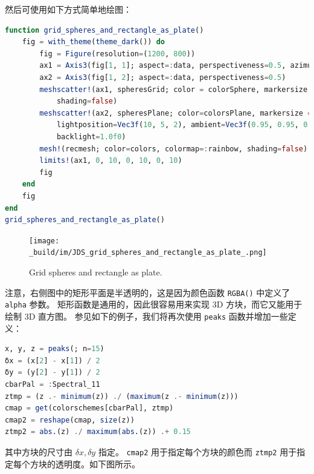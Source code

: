 \documentclass[
  notoc %
]{tufte-book}
\newcommand{\passthrough}[1]{#1}
\begin{document}
然后可使用如下方式简单地绘图：

\begin{lstlisting}[language=Julia]
function grid_spheres_and_rectangle_as_plate()
    fig = with_theme(theme_dark()) do
        fig = Figure(resolution=(1200, 800))
        ax1 = Axis3(fig[1, 1]; aspect=:data, perspectiveness=0.5, azimuth=0.72)
        ax2 = Axis3(fig[1, 2]; aspect=:data, perspectiveness=0.5)
        meshscatter!(ax1, spheresGrid; color = colorSphere, markersize = 1,
            shading=false)
        meshscatter!(ax2, spheresPlane; color=colorsPlane, markersize = 0.75,
            lightposition=Vec3f(10, 5, 2), ambient=Vec3f(0.95, 0.95, 0.95),
            backlight=1.0f0)
        mesh!(recmesh; color=colors, colormap=:rainbow, shading=false)
        limits!(ax1, 0, 10, 0, 10, 0, 10)
        fig
    end
    fig
end
grid_spheres_and_rectangle_as_plate()
\end{lstlisting}

\begin{figure}
\hypertarget{fig:grid_spheres_and_rectangle_as_plate}{%
\centering
\texttt{[image: \_build/im/JDS\_grid\_spheres\_and\_rectangle\_as\_plate\_.png]}
\caption{Grid spheres and rectangle as
plate.}\label{fig:grid_spheres_and_rectangle_as_plate}
}
\end{figure}

注意，右侧图中的矩形平面是半透明的，这是因为颜色函数
\passthrough{\lstinline!RGBA()!} 中定义了
\passthrough{\lstinline!alpha!} 参数。
矩形函数是通用的，因此很容易用来实现 3D 方块，而它又能用于绘制 3D
直方图。 参见如下的例子，我们将再次使用 \passthrough{\lstinline!peaks!}
函数并增加一些定义：

\begin{lstlisting}[language=Julia]
x, y, z = peaks(; n=15)
δx = (x[2] - x[1]) / 2
δy = (y[2] - y[1]) / 2
cbarPal = :Spectral_11
ztmp = (z .- minimum(z)) ./ (maximum(z .- minimum(z)))
cmap = get(colorschemes[cbarPal], ztmp)
cmap2 = reshape(cmap, size(z))
ztmp2 = abs.(z) ./ maximum(abs.(z)) .+ 0.15
\end{lstlisting}

其中方块的尺寸由 \(\delta x, \delta y\) 指定。
\passthrough{\lstinline!cmap2!} 用于指定每个方块的颜色而
\passthrough{\lstinline!ztmp2!} 用于指定每个方块的透明度。如下图所示。
\end{document}
